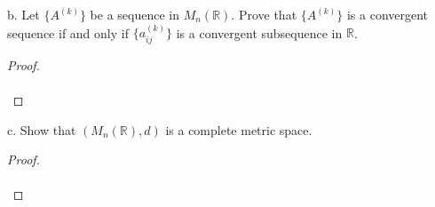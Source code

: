     \pagebreak

b.  Let $\{A^{(k)}\}$ be a sequence in $M_n(\mathbb{R})$. Prove that
    $\{A^{(k)}\}$ is a convergent sequence if and only if $\{a_{ij}^{(k)}\}$ is
    a convergent subsequence in $\mathbb{R}$.\ \\

    \begin{proof}\renewcommand{\qedsymbol}{}\ \\\\
    \end{proof}

    \pagebreak

c.  Show that $\left(M_n(\mathbb{R}), d\right)$ is a complete metric space.

    \begin{proof}\renewcommand{\qedsymbol}{}\ \\\\
    \end{proof}

    \pagebreak